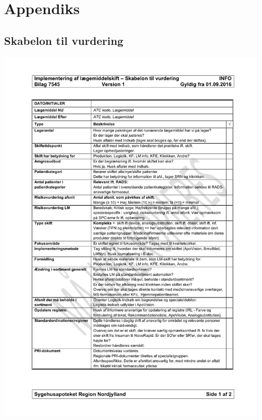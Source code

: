
\newpage														%
\listoffixmes													%



\appendix


% 

\chapter{Appendiks} \vspace{-1cm} \section{Skabelon til vurdering}\label{App:Skabelon} 
\vspace{-1.2cm}
\includegraphics[scale=0.7]{appendiks/skabelon.pdf}

